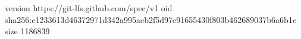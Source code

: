 version https://git-lfs.github.com/spec/v1
oid sha256:c1233613d46372971d342a995aeb2f5d97e91655430f803b462689037b6a6b1c
size 1186839
